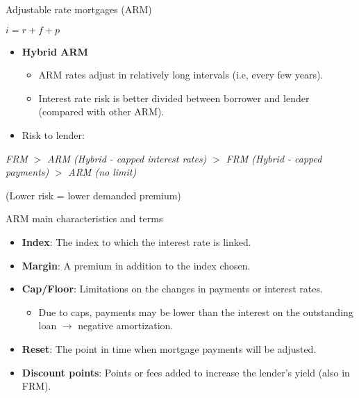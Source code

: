 \documentclass[ignorenonframetext,]{beamer}
\providecommand{\tightlist}{%
\setlength{\itemsep}{0pt}\setlength{\parskip}{0pt}}
\begin{document}
\begin{frame}{Adjustable rate mortgages (ARM)}

\(i = r + f + p\)

\begin{itemize}
\tightlist
\item
  \textbf{Hybrid ARM}

  \begin{itemize}
  \tightlist
  \item
    ARM rates adjust in relatively long intervals (i.e, every few
    years).
  \item
    Interest rate risk is better divided between borrower and lender
    (compared with other ARM).
  \end{itemize}
\item
  Risk to lender:
\end{itemize}

\small

\emph{FRM} \(>\) \emph{ARM (Hybrid - capped interest rates)} \(>\)
\emph{FRM (Hybrid - capped payments)} \(>\) \emph{ARM (no limit)}

\normalsize

(Lower risk = lower demanded premium)

\end{frame}

\begin{frame}{ARM main characteristics and terms}

\begin{itemize}
\tightlist
\item
  \textbf{Index}: The index to which the interest rate is linked.
\item
  \textbf{Margin}: A premium in addition to the index chosen.
\item
  \textbf{Cap/Floor}: Limitations on the changes in payments or interest
  rates.

  \begin{itemize}
  \tightlist
  \item
    Due to caps, payments may be lower than the interest on the
    outstanding loan \(\rightarrow\) negative amortization.
  \end{itemize}
\item
  \textbf{Reset}: The point in time when mortgage payments will be
  adjusted.
\item
  \textbf{Discount points}: Points or fees added to increase the
  lender's yield (also in FRM).
\end{itemize}

\end{frame}
\end{document}
